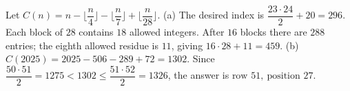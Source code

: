 Let $C(n)=n-\lfloor\dfrac{n}{4}\rfloor-\lfloor\dfrac{n}{7}\rfloor+\lfloor\dfrac{n}{28}\rfloor$. (a) The desired index is $\dfrac{23\cdot24}{2}+20=296$. Each block of $28$ contains $18$ allowed integers. After $16$ blocks there are $288$ entries; the eighth allowed residue is $11$, giving $16\cdot28+11=\boxed{459}$. (b) $C(2025)=2025-506-289+72=1302$. Since $\dfrac{50\cdot51}{2}=1275<1302\le\dfrac{51\cdot52}{2}=1326$, the answer is $\boxed{\text{row }51,\ \text{position }27}$.
